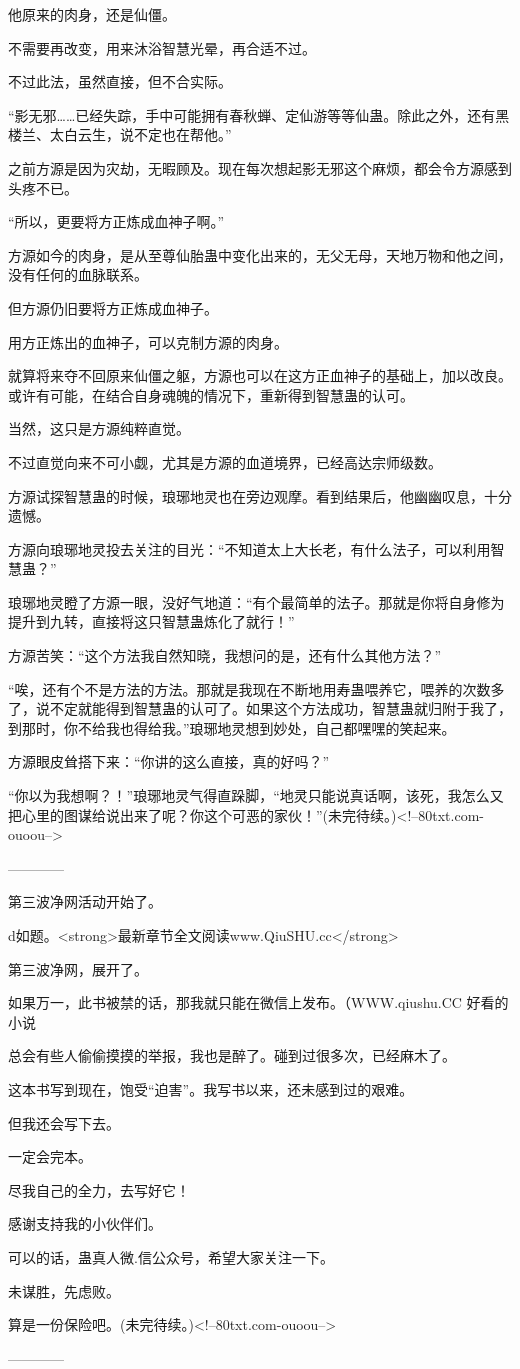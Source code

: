 \begin{this_body}
他原来的肉身，还是仙僵。

不需要再改变，用来沐浴智慧光晕，再合适不过。

不过此法，虽然直接，但不合实际。

“影无邪……已经失踪，手中可能拥有春秋蝉、定仙游等等仙蛊。除此之外，还有黑楼兰、太白云生，说不定也在帮他。”

之前方源是因为灾劫，无暇顾及。现在每次想起影无邪这个麻烦，都会令方源感到头疼不已。

“所以，更要将方正炼成血神子啊。”

方源如今的肉身，是从至尊仙胎蛊中变化出来的，无父无母，天地万物和他之间，没有任何的血脉联系。

但方源仍旧要将方正炼成血神子。

用方正炼出的血神子，可以克制方源的肉身。

就算将来夺不回原来仙僵之躯，方源也可以在这方正血神子的基础上，加以改良。或许有可能，在结合自身魂魄的情况下，重新得到智慧蛊的认可。

当然，这只是方源纯粹直觉。

不过直觉向来不可小觑，尤其是方源的血道境界，已经高达宗师级数。

方源试探智慧蛊的时候，琅琊地灵也在旁边观摩。看到结果后，他幽幽叹息，十分遗憾。

方源向琅琊地灵投去关注的目光：“不知道太上大长老，有什么法子，可以利用智慧蛊？”

琅琊地灵瞪了方源一眼，没好气地道：“有个最简单的法子。那就是你将自身修为提升到九转，直接将这只智慧蛊炼化了就行！”

方源苦笑：“这个方法我自然知晓，我想问的是，还有什么其他方法？”

“唉，还有个不是方法的方法。那就是我现在不断地用寿蛊喂养它，喂养的次数多了，说不定就能得到智慧蛊的认可了。如果这个方法成功，智慧蛊就归附于我了，到那时，你不给我也得给我。”琅琊地灵想到妙处，自己都嘿嘿的笑起来。

方源眼皮耸搭下来：“你讲的这么直接，真的好吗？”

“你以为我想啊？！”琅琊地灵气得直跺脚，“地灵只能说真话啊，该死，我怎么又把心里的图谋给说出来了呢？你这个可恶的家伙！”(未完待续。)<!--80txt.com-ouoou-->

------------

第三波净网活动开始了。

d如题。<strong>最新章节全文阅读www.QiuSHU.cc</strong>

第三波净网，展开了。

如果万一，此书被禁的话，那我就只能在微信上发布。（WWW.qiushu.CC 好看的小说

总会有些人偷偷摸摸的举报，我也是醉了。碰到过很多次，已经麻木了。

这本书写到现在，饱受“迫害”。我写书以来，还未感到过的艰难。

但我还会写下去。

一定会完本。

尽我自己的全力，去写好它！

感谢支持我的小伙伴们。

可以的话，蛊真人微.信公众号，希望大家关注一下。

未谋胜，先虑败。

算是一份保险吧。(未完待续。)<!--80txt.com-ouoou-->

------------

\end{this_body}

